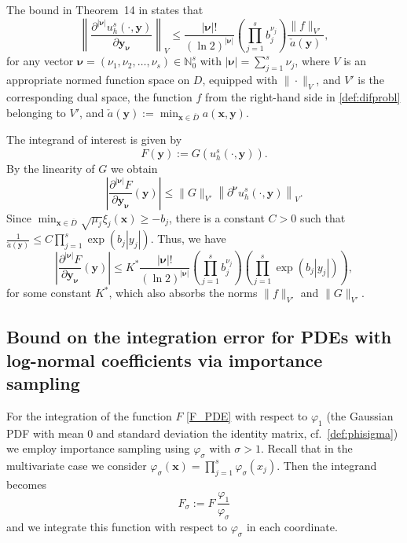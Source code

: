 \documentclass[namedate,webpdf,imanum]{ima-authoring-arxiv}%
\theoremstyle{thmstyletwo}%
\numberwithin{equation}{section}
\newcommand{\bsx}{\boldsymbol{x}}
\newcommand{\bsy}{\boldsymbol{y}}
\newcommand{\bsnu}{\boldsymbol{\nu}}
\newcommand{\NN}{\mathbb{N}}
\begin{document}
The bound in Theorem~14 in \cite{GKNSSS15} states that
\begin{equation*}
\left\| \frac{\partial^{|\boldsymbol{\nu}|} u_h^s(\cdot, \bsy)}{\partial \bsy_{\bsnu}} \right\|_V \le \frac{|\boldsymbol{\nu}|!}{(\ln 2)^{|\boldsymbol{\nu}|}} \left( \prod_{j = 1}^s b_j^{\nu_j} \right) \frac{\|f\|_{V'}}{\check{a}(\bsy)},
\end{equation*}
for any vector $\boldsymbol{\nu} = (\nu_1, \nu_2, \ldots, \nu_s ) \in \NN_0^{s}$ with $|\boldsymbol{\nu}| = \sum_{j=1}^s \nu_j$, where $V$ is an appropriate normed function space on $D$, equipped with $\|\cdot\|_V$, and $V'$ is the corresponding dual space, the function $f$ from the right-hand side in \eqref{def:difprobl} belonging to $V'$, and $\check{a}(\bsy) := \min_{\bsx \in \overline{D}} a(\bsx, \bsy)$. 

The integrand of interest is given by
\begin{equation}\label{F_PDE}
F(\bsy) := G(u_h^s(\cdot, \bsy)). 
\end{equation}
By the linearity of $G$ we obtain
\begin{equation*}
\left| \frac{\partial^{|\boldsymbol{\nu}|} F}{\partial \bsy_{\boldsymbol{\nu}}}(\bsy)  \right| \le \|G\|_{V'} \left\| \partial^{\boldsymbol{\nu}} u_h^s(\cdot, \bsy) \right\|_V.
\end{equation*}
Since $\min_{ \bsx \in \overline{D}} \sqrt{\mu_j} \xi_j(\bsx) \ge - b_j$, there is a constant $C > 0$ such that $\frac{1}{\check{a}(\bsy)} \le C \prod_{j=1}^s \exp( b_j |y_j|)$. Thus, we have
\begin{equation}\label{est:norm:assumpt}
\left|\frac{\partial^{|\boldsymbol{\nu}|} F}{\partial \bsy_{\boldsymbol{\nu}}}(\boldsymbol{y}) \right| \le K^\ast \frac{|\boldsymbol{\nu}|!}{(\ln 2)^{|\boldsymbol{\nu}|}} \left( \prod_{j =1}^s b_j^{\nu_j} \right) \left( \prod_{j=1}^s \exp(b_j |y_j|) \right),
\end{equation}
for some constant $K^\ast$, which also absorbs the norms $\|f\|_{V'}$ and $\|G\|_{V'}$. 


\subsection{Bound on the integration error for PDEs with log-normal coefficients via importance sampling}

For the integration of the function $F$ \eqref{F_PDE} with respect to $\varphi_1$ (the Gaussian PDF with mean 0 and standard deviation the identity matrix, cf.~\eqref{def:phisigma}) we employ importance sampling using $\varphi_\sigma$ with $\sigma > 1$. Recall that in the multivariate case we consider $\varphi_{\sigma}(\bsx)=\prod_{j=1}^s \varphi_{\sigma}(x_j)$. Then the integrand becomes 
\begin{equation}\label{F_sigma_PDE}
F_\sigma:=F \, \frac{\varphi_1}{\varphi_\sigma}
\end{equation}
and we integrate this function with respect to $\varphi_\sigma$ in each coordinate.
\end{document}

